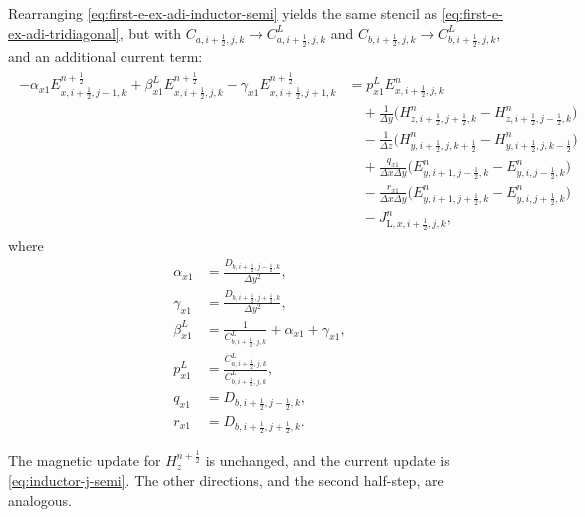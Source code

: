 \documentclass{article}
\numberwithin{equation}{section}
\numberwithin{figure}{section}
\begin{document}
Rearranging \eqref{eq:first-e-ex-adi-inductor-semi} yields the same stencil as \eqref{eq:first-e-ex-adi-tridiagonal}, but with $C_{a,i+\tfrac12,j,k}\to C_{a,i+\tfrac12,j,k}^{L}$ and $C_{b,i+\tfrac12,j,k}\to C_{b,i+\tfrac12,j,k}^{L}$, and an additional current term:
\begin{align}
    \begin{split}
        -\alpha_{x1}E_{x,i+\tfrac12,j-1,k}^{n+\frac12}
        + \beta_{x1}^{L}E_{x,i+\tfrac12,j,k}^{n+\frac12}
        - \gamma_{x1}E_{x,i+\tfrac12,j+1,k}^{n+\frac12}
         & = p_{x1}^{L}E_{x,i+\tfrac12,j,k}^{n}                                                                   \\
         & \quad +\frac{1}{\Delta y}\Big(H_{z,i+\tfrac12,j+\tfrac12,k}^{n}-H_{z,i+\tfrac12,j-\tfrac12,k}^{n}\Big) \\
         & \quad -\frac{1}{\Delta z}\Big(H_{y,i+\tfrac12,j,k+\tfrac12}^{n}-H_{y,i+\tfrac12,j,k-\tfrac12}^{n}\Big) \\
         & \quad +\frac{q_{x1}}{\Delta x\Delta y}\Big(E_{y,i+1,j-\tfrac12,k}^{n}-E_{y,i,j-\tfrac12,k}^{n}\Big)    \\
         & \quad -\frac{r_{x1}}{\Delta x\Delta y}\Big(E_{y,i+1,j+\tfrac12,k}^{n}-E_{y,i,j+\tfrac12,k}^{n}\Big)    \\
         & \quad - J_{\mathrm{L},x,i+\tfrac12,j,k}^{n},
    \end{split}
    \label{eq:first-e-ex-adi-tridiagonal-inductor}
\end{align}
where
\begin{align}
    \alpha_{x1} & =\frac{D_{b,i+\tfrac12,j-\tfrac12,k}}{\Delta y^2},           \\
    \gamma_{x1} & =\frac{D_{b,i+\tfrac12,j+\tfrac12,k}}{\Delta y^2},           \\
    \beta_{x1}^{L}
                & =\frac{1}{C_{b,i+\tfrac12,j,k}^{L}}+\alpha_{x1}+\gamma_{x1}, \\
    p_{x1}^{L}
                & =\frac{C_{a,i+\tfrac12,j,k}^{L}}{C_{b,i+\tfrac12,j,k}^{L}},  \\
    q_{x1}      & =D_{b,i+\tfrac12,j-\tfrac12,k},                              \\
    r_{x1}      & =D_{b,i+\tfrac12,j+\tfrac12,k}.
\end{align}

The magnetic update for $H_z^{n+\frac12}$ is unchanged, and the current update is \eqref{eq:inductor-j-semi}. The other directions, and the second half-step, are analogous.
\end{document}
